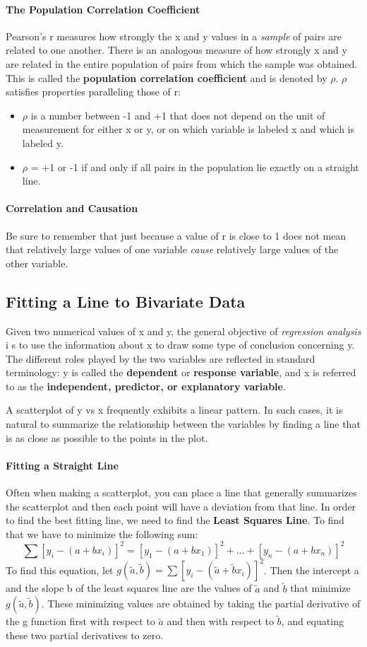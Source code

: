 \documentclass{article}
\newcommand{\p}[1]{\paragraph{#1}} %
\begin{document}
	\p{The Population Correlation Coefficient}
		Pearson's r measures how strongly the x and y values in a \textit{sample} of pairs are 
		related to one another. There is an analogous measure of how strongly x and y are related 
		in the entire population of pairs from which the sample was obtained. This is called the 
		\textbf{population correlation coefficient} and is denoted by $\rho$. $\rho$ satisfies 
		properties paralleling those of r:
		\begin{itemize}
			\item{$\rho$ is a number between -1 and +1 that does not depend on the unit of 
			measurement for either x or y, or on which variable is labeled x and which is labeled 
			y}.
			\item{$\rho$ = +1 or -1 if and only if all pairs in the population lie exactly on a straight 
			line.}
		\end{itemize}
		
	\p{Correlation and Causation}
		Be sure to remember that just because a value of r is close to 1 does not mean that 
		relatively large values of one variable \textit{cause} relatively large values of the other 
		variable.
	
	\subsection{Fitting a Line to Bivariate Data} %
	Given two numerical values of x and y, the general objective of \textit{regression analysis} i
	s to use the information about x to draw some type of conclusion concerning y. The 
	different roles played by the two variables are reflected in standard terminology: y is called 
	the \textbf{dependent} or \textbf{response variable}, and x is referred to as the 
	\textbf{independent, predictor, or explanatory variable}. 
		
	A scatterplot of y vs x frequently exhibits a linear pattern. In such cases, it is natural to 
	summarize the relationship between the variables by finding a line that is as close as 
	possible to the points in the plot.
		
	\p{Fitting a Straight Line} Often when making a scatterplot, you can place a line 
		that generally summarizes the scatterplot and then each point will have a deviation from 
		that line. In order to find the best fitting line, we need to find the \textbf{Least Squares 
		Line}. To find that we have to minimize the following sum:
		\[ \sum[y_i-(a+bx_i)]^2 = [y_1-(a+bx_1)]^2+...+[y_n-(a+bx_n)]^2 \]
		To find this equation, let $g(\tilde{a},\tilde{b}) = \sum[y_i - (\tilde{a}+
		\tilde{b}x_i)]^2$. Then the intercept a and the slope b of the least squares line are the 
		values of $\tilde{a}$ and $\tilde{b}$ that minimize $g(\tilde{a},\tilde{b})$. 
		These minimizing values are obtained by taking the partial derivative of the g function first 
		with respect to $\tilde{a}$ and then with respect to $\tilde{b}$, and equating these 
		two partial derivatives to zero. \\
		
\end{document}
